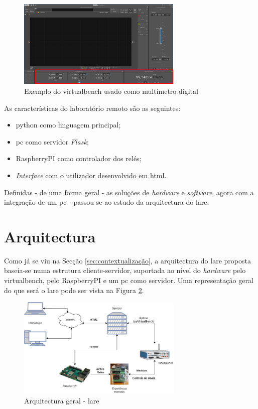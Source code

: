 \begin{figure}[hbtp]
    \centering
    \includegraphics[width=0.7\textwidth]{figures/VB8012-OHM_Exemplo.png}
    \caption{Exemplo do \acrshort{virtualbench} usado como multímetro digital}
    \label{fig:leituraohm}
\end{figure}

As características do \acrshort{laboratório remoto} são as seguintes:
\begin{itemize}
    \item \gls{python} como linguagem principal;
    \item \acrshort{pc} como servidor \textit{Flask};
    \item \gls{RaspberryPI} como controlador dos relés;
    \item \textit{Interface} com o utilizador desenvolvido em \acrshort{html}.
\end{itemize}

Definidas - de uma forma geral - as soluções de \textit{hardware} e \textit{software}, agora com a integração de um \acrshort{pc} - passou-se ao estudo da arquitectura do \acrshort{lare}.

\section{Arquitectura}
\label{sec:arquitectura}
Como já se viu na Secção \ref{sec:contextualização}, a arquitectura do \acrshort{lare} proposta baseia-se numa estrutura cliente-servidor, suportada ao nível do \textit{hardware} pelo \acrshort{virtualbench}, pelo \gls{RaspberryPI} e um \acrshort{pc} como servidor. Uma representação geral do que será o \acrshort{lare} pode ser vista na Figura \ref{fig:representaçãogerallare}.

\begin{figure}[hbtp]
    \centering
    \includegraphics[width=0.7\textwidth]{figures/arquitectura_ver2.drawio.png}
    \caption{Arquitectura geral - \acrshort{lare}}
    \label{fig:representaçãogerallare}
\end{figure}

